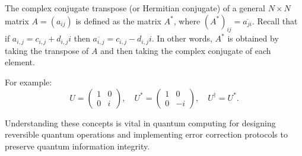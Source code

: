 \documentclass[12pt]{article}
\begin{document}
The complex conjugate transpose (or Hermitian conjugate) of a general \( N \times N \) matrix \( A = (a_{ij}) \) is defined as the matrix \( A^* \), where \( (A^*)_{ij} = \overline{a_{ji}} \). Recall that if $a_{i,j} = c_{i,j} + d_{i,j}i$ then  $\overline{a_{i,j} }= c_{i,j} - d_{i,j}i$. In other words, \( A^* \) is obtained by taking the transpose of \( A \) and then taking the complex conjugate of each element.

For example:
\[
U = \begin{pmatrix}
1 & 0\\
0& i
\end{pmatrix}, \quad
U^* = \begin{pmatrix}
1& 0 \\
0& -i
\end{pmatrix}, \quad
U^\dagger = U^*.
\]

Understanding these concepts is vital in quantum computing for designing reversible quantum operations and implementing error correction protocols to preserve quantum information integrity.
\end{document}
